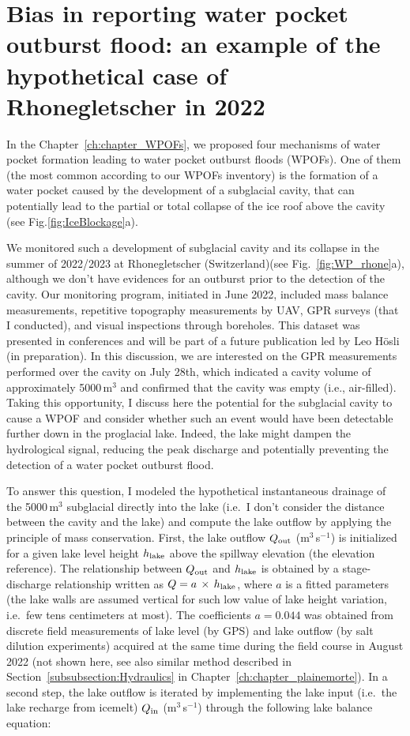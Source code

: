 \section{Bias in reporting water pocket outburst flood: an example of the hypothetical case of Rhonegletscher in 2022}


In the Chapter~\ref{ch:chapter_WPOFs}, we proposed four mechanisms of water pocket formation leading to water pocket outburst floods (WPOFs). One of them (the most common according to our WPOFs inventory) is the formation of a water pocket caused by the development of a subglacial cavity, that can potentially lead to the partial or total collapse of the ice roof above the cavity (see Fig.\ref{fig:IceBlockage}a). 

We monitored such a development of subglacial cavity and its collapse in the summer of 2022/2023 at Rhonegletscher (Switzerland)(see Fig.~\ref{fig:WP_rhone}a), although we don't have evidences for an outburst prior to the detection of the cavity. Our monitoring program, initiated in June 2022, included mass balance measurements, repetitive topography measurements by UAV, GPR surveys (that I conducted), and visual inspections through boreholes. This dataset was presented in conferences \citep{Ogier&al2022,Hosli&al2022,Bauder&al2023} and  will be part of a future publication led by Leo Hösli (in preparation). In this discussion, we are interested on the GPR measurements performed over the cavity on July 28th, which indicated a cavity volume of approximately 5000\,m$^3$ and confirmed that the cavity was empty (i.e., air-filled). Taking this opportunity, I discuss here the potential for the subglacial cavity to cause a WPOF and consider whether such an event would have been detectable further down in the proglacial lake. Indeed, the lake might dampen the hydrological signal, reducing the peak discharge and potentially preventing the detection of a water pocket outburst flood. 

To answer this question, I modeled the hypothetical instantaneous drainage of the 5000\,m$^3$ subglacial directly into the lake (i.e.\ I don't consider the distance between the cavity and the lake) and compute the lake outflow by applying the principle of mass conservation. First, the lake outflow $Q_{\rm out}$ (m$^3$\,s$^{-1}$) is initialized for a given lake level height $h_{\rm lake}$ above the spillway elevation (the elevation reference). The relationship between $Q_{\rm out}$ and $h_{\rm lake}$ is obtained by a stage-discharge relationship written as $Q = a\,\times\,h_{\rm lake}$, where $a$ is a fitted parameters (the lake walls are assumed vertical for such low value of lake height variation, i.e.\ few tens centimeters at most). The coefficients $a = 0.044$ was obtained from discrete field measurements of lake level (by GPS) and lake outflow (by salt dilution experiments) acquired at the same time during the field course in August 2022 (not shown here, see also similar method described in Section~\ref{subsubsection:Hydraulics} in Chapter~\ref{ch:chapter_plainemorte}). In a second step, the lake outflow is iterated by implementing the lake input (i.e.\ the lake recharge from icemelt) $Q_{\rm in}$ (m$^3$\,s$^{-1}$) through the following lake balance equation:

